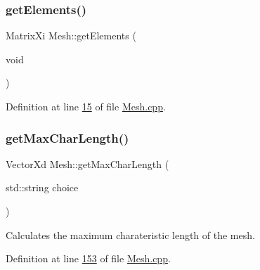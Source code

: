 \subsubsection{\texorpdfstring{get\+Elements()}{getElements()}}
{\footnotesize\ttfamily Matrix\+Xi Mesh\+::get\+Elements (\begin{DoxyParamCaption}\item[{void}]{ }\end{DoxyParamCaption})}



Definition at line \hyperlink{_mesh_8cpp_source_l00015}{15} of file \hyperlink{_mesh_8cpp_source}{Mesh.\+cpp}.

\mbox{\label{class_mesh_a72d2a3863b85a2a2aed7deca8ce37832}} 
\subsubsection{\texorpdfstring{get\+Max\+Char\+Length()}{getMaxCharLength()}}
{\footnotesize\ttfamily Vector\+Xd Mesh\+::get\+Max\+Char\+Length (\begin{DoxyParamCaption}\item[{std\+::string}]{choice }\end{DoxyParamCaption})}



Calculates the maximum charateristic length of the mesh. 



Definition at line \hyperlink{_mesh_8cpp_source_l00153}{153} of file \hyperlink{_mesh_8cpp_source}{Mesh.\+cpp}.

